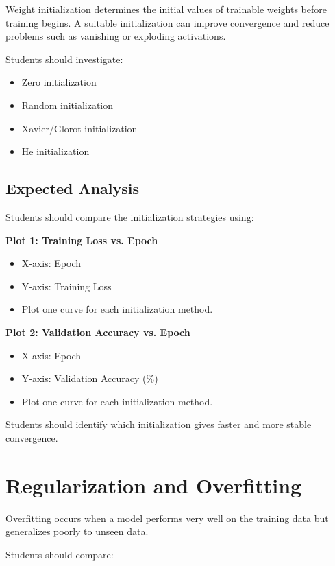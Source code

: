 \documentclass[10pt]{article}
\begin{document}
Weight initialization determines the initial values of trainable weights
before training begins. A suitable initialization can improve convergence
and reduce problems such as vanishing or exploding activations.

Students should investigate:

\begin{itemize}
\item Zero initialization
\item Random initialization
\item Xavier/Glorot initialization
\item He initialization
\end{itemize}

\subsection*{Expected Analysis}

Students should compare the initialization strategies using:

\textbf{Plot 1: Training Loss vs. Epoch}

\begin{itemize}
\item X-axis: Epoch
\item Y-axis: Training Loss
\item Plot one curve for each initialization method.
\end{itemize}

\textbf{Plot 2: Validation Accuracy vs. Epoch}

\begin{itemize}
\item X-axis: Epoch
\item Y-axis: Validation Accuracy (\%)
\item Plot one curve for each initialization method.
\end{itemize}

Students should identify which initialization gives faster and more
stable convergence.

\section{Regularization and Overfitting}

Overfitting occurs when a model performs very well on the training data
but generalizes poorly to unseen data.

Students should compare:
\end{document}
